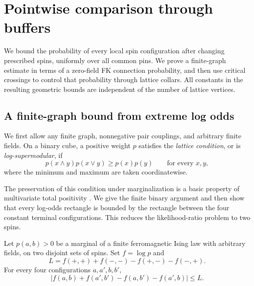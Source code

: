 \section{Pointwise comparison through buffers}\label{fd:section}

We bound the probability of every local spin configuration after changing
prescribed spins, uniformly over all common pins.
We prove a finite-graph estimate in terms of a zero-field FK connection
probability, and then use critical crossings to control that probability
through lattice collars. All constants in the resulting geometric bounds
are independent of the number of lattice vertices.

\subsection{A finite-graph bound from extreme log odds}

We first allow any finite graph, nonnegative pair couplings, and arbitrary
finite fields. On a binary cube, a positive weight $p$ satisfies the
\emph{lattice condition}, or is \emph{log-supermodular}, if
\[
 p(x\wedge y)p(x\vee y)\ge p(x)p(y)
 \qquad\text{for every }x,y,
\]
where the minimum and maximum are taken coordinatewise.

The preservation of this condition under marginalization is a basic
property of multivariate total positivity \cite{KarlinRinott1980}.
We give the finite binary argument and then show that every log-odds
rectangle is bounded by the rectangle between the four constant terminal
configurations. This reduces the likelihood-ratio problem to two spins.

\begin{lemma}
\label{fd:mtp2}
Let \(p(a,b)>0\) be a marginal of a finite ferromagnetic Ising law with
arbitrary fields, on two disjoint sets of spins.  Set \(f=\log p\) and
\[
 L=f(+,+)+f(-,-)-f(+,-)-f(-,+).
\]
For every four configurations \(a,a',b,b'\),
\begin{equation}
 \left|f(a,b)+f(a',b')-f(a,b')-f(a',b)\right|\le L.
 \label{fd:extreme-rectangle}
\end{equation}
\end{lemma}

